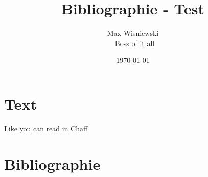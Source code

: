 \documentclass[ngerman,a4paper,11pt]{article}
\title{Bibliographie - Test}
\author{Max Wisniewski\\~Boss of it all}
\date{\today}
\begin{document}
\maketitle

\section{Text}

Like you can read in Chaff~\cite{satsolver:chaff}

\section{Bibliographie}



\end{document}
